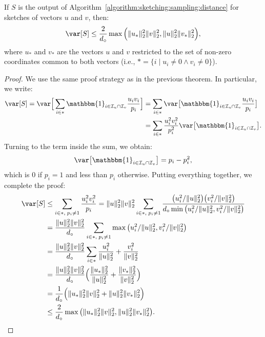 \begin{theorem}
    \label{theorem:sketching:sampling:variance}
    If $S$ is the output of Algorithm~\ref{algorithm:sketching:sampling:distance}
    for sketches of vectors $u$ and $v$, then:
    \begin{equation*}
        \var[S] \leq \frac{2}{d_\circ} \max \Big( \lVert u_\ast \rVert_2^2 \lVert v \rVert_2^2,
        \lVert u \rVert_2^2 \lVert v_\ast \rVert_2^2 \Big),
    \end{equation*}
    where $u_\ast$ and $v_\ast$ are the vectors $u$ and $v$ restricted to
    the set of non-zero coordinates common to both vectors (i.e., $\ast = \{ i \;|\; u_i \neq 0 \land v_i \neq 0 \}$).
\end{theorem}
\begin{proof}
    We use the same proof strategy as in the previous theorem.
    In particular, we write:
    \begin{align*}
        \var[S] =
        \var\Big[\sum_{i \in \ast} \mathbbm{1}_{i \in \mathcal{I}_u \cap \mathcal{I}_v} \frac{u_i v_i}{p_i}\Big]
        &= \sum_{i \in \ast} \var\big[ \mathbbm{1}_{i \in \mathcal{I}_u \cap \mathcal{I}_v} \frac{u_i v_i}{p_i} \big] \\
        &= \sum_{i \in \ast} \frac{u_i^2 v_i^2}{p_i^2} \var\big[ \mathbbm{1}_{i \in \mathcal{I}_u \cap \mathcal{I}_v} \big].
    \end{align*}
    Turning to the term inside the sum, we obtain:
    \begin{equation*}
        \var\big[ \mathbbm{1}_{i \in \mathcal{I}_u \cap \mathcal{I}_v} \big] = p_i - p_i^2,
    \end{equation*}
    which is $0$ if $p_i = 1$ and less than $p_i$ otherwise.
    Putting everything together, we complete the proof:
    \begin{align*}
        \var[S] &\leq \sum_{i \in \ast,\; p_i \neq 1} \frac{u_i^2 v_i^2}{p_i} =
            \lVert u \rVert_2^2 \lVert v \rVert_2^2
                \sum_{i \in \ast,\; p_i \neq 1} \frac{\big(u_i^2/\lVert u \rVert_2^2 \big) \big( v_i^2/\lVert v \rVert_2^2 \big)}{d_\circ \min\big( u_i^2/\lVert u \rVert_2^2, v_i^2/\lVert v \rVert_2^2 \big)} \\
        &= \frac{\lVert u \rVert_2^2 \lVert v \rVert_2^2}{d_\circ}
                \sum_{i \in \ast,\; p_i \neq 1} \max\big( u_i^2/\lVert u \rVert_2^2, v_i^2/\lVert v \rVert_2^2 \big) \\
        &= \frac{\lVert u \rVert_2^2 \lVert v \rVert_2^2}{d_\circ} \sum_{i \in \ast} \frac{u_i^2}{\lVert u \rVert_2^2} + \frac{v_i^2}{\lVert v \rVert_2^2} \\
        &= \frac{\lVert u \rVert_2^2 \lVert v \rVert_2^2}{d_\circ} \Big( \frac{\lVert u_\ast \rVert_2^2}{\lVert u \rVert_2^2} + \frac{\lVert v_\ast \rVert_2^2}{\lVert v \rVert_2^2} \Big) \\
        &= \frac{1}{d_\circ} \Big( \lVert u_\ast \rVert_2^2 \lVert v \rVert_2^2 + \lVert u \rVert_2^2 \lVert v_\ast \rVert_2^2 \Big) \\
        &\leq \frac{2}{d_\circ} \max \big( \lVert u_\ast \rVert_2^2 \lVert v \rVert_2^2, \lVert u \rVert_2^2 \lVert v_\ast \rVert_2^2 \big).
    \end{align*}
\end{proof}

